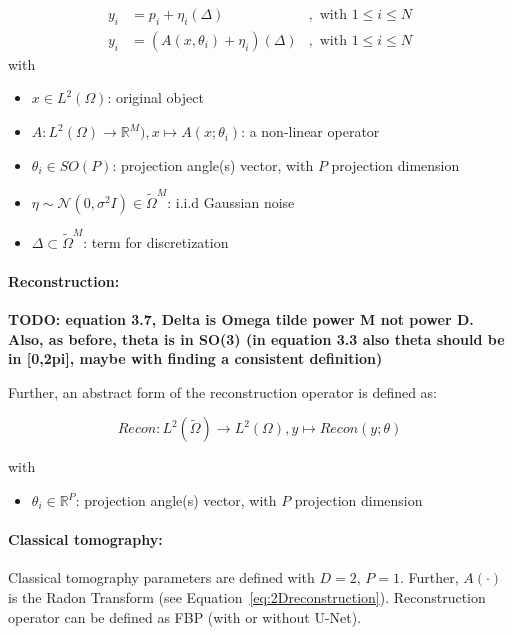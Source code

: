 \begin{equation}
    \label{eq:abstract-model}
    \begin{aligned}
        y_i &= p_i + \eta_i (\Delta) &, \text{ with } 1 \leq i \leq N \\
        y_i &= \left( A(x, \theta_i) + \eta_i \right) (\Delta) &, \text{ with } 1 \leq i \leq N 
    \end{aligned}
\end{equation}
with
\begin{itemize}
    \item $x \in L^2(\Omega)$: original object
    \item $A: L^2(\Omega) \to \mathbb{R}^M), x \mapsto A(x; \theta_i)$: a non-linear operator 
    \item $\theta_i \in SO(P)$: projection angle(s) vector, with $P$ projection dimension
    \item $\eta \sim \mathcal{N}(0, \sigma^2 I) \in \tilde{\Omega}^M$: i.i.d Gaussian noise
    \item $\Delta \subset \tilde{\Omega}^{M}$: term for discretization
\end{itemize}

\paragraph{Reconstruction:}
\textbf{TODO: 
equation 3.7, Delta is Omega tilde power M not power D.
Also, as before, theta is in SO(3) (in equation 3.3 also theta should be in [0,2pi], maybe with finding a consistent definition)}


Further, an abstract form of the reconstruction operator is defined as:

\begin{equation}
    \textit{Recon} : L^2(\tilde{\Omega}) \to L^2(\Omega), y \mapsto Recon(y; \theta)
\end{equation}

with
\begin{itemize}
    \item $\theta_i \in \mathbb{R}^P$: projection angle(s) vector, with $P$ projection dimension
\end{itemize}

\paragraph{Classical tomography:}
Classical tomography parameters are defined with $D=2$, $P=1$.
Further, $A(\cdot)$ is the Radon Transform (see Equation~\ref{eq:2Dreconstruction}).
Reconstruction operator can be defined as FBP (with or without U-Net).


